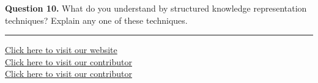 \documentclass[11pt,a4paper]{article}
\begin{document}
\medskip


\noindent   \textbf{Question 10.} What do you understand by structured knowledge representation techniques? Explain any one of these techniques.

\vfill
\rule{\linewidth}{0.4pt}

\begin{center}\small
\href{https://bhu-exam.vercel.app/}{Click here to visit our website}\\[4pt]\href{https://me-aryan.vercel.app/}{Click here to visit our contributor}\\[4pt]\href{https://quashan-me.vercel.app/}{Click here to visit our contributor}
\end{center}
\end{document}
